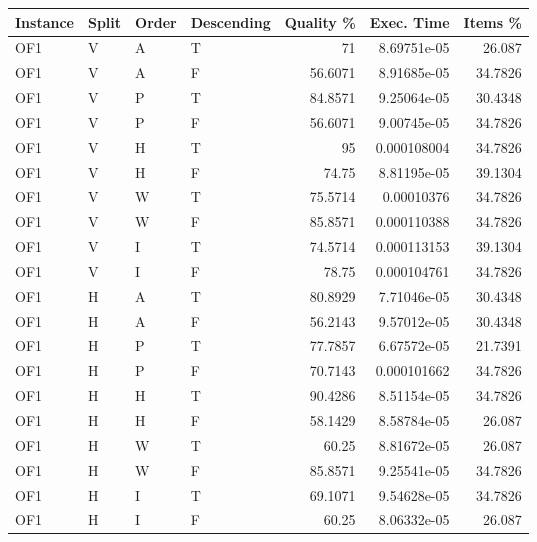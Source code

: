 \begin{longtable}{llllrrr}
    \hline
    Instance & Split & Order & Descending & Quality \% & Exec. Time  & Items \% \\
    \hline
    \endhead
    OF1      & V     & A     & T          & 71         & 8.69751e-05 & 26.087   \\
    OF1      & V     & A     & F          & 56.6071    & 8.91685e-05 & 34.7826  \\
    OF1      & V     & P     & T          & 84.8571    & 9.25064e-05 & 30.4348  \\
    OF1      & V     & P     & F          & 56.6071    & 9.00745e-05 & 34.7826  \\
    OF1      & V     & H     & T          & 95         & 0.000108004 & 34.7826  \\
    OF1      & V     & H     & F          & 74.75      & 8.81195e-05 & 39.1304  \\
    OF1      & V     & W     & T          & 75.5714    & 0.00010376  & 34.7826  \\
    OF1      & V     & W     & F          & 85.8571    & 0.000110388 & 34.7826  \\
    OF1      & V     & I     & T          & 74.5714    & 0.000113153 & 39.1304  \\
    OF1      & V     & I     & F          & 78.75      & 0.000104761 & 34.7826  \\
    OF1      & H     & A     & T          & 80.8929    & 7.71046e-05 & 30.4348  \\
    OF1      & H     & A     & F          & 56.2143    & 9.57012e-05 & 30.4348  \\
    OF1      & H     & P     & T          & 77.7857    & 6.67572e-05 & 21.7391  \\
    OF1      & H     & P     & F          & 70.7143    & 0.000101662 & 34.7826  \\
    OF1      & H     & H     & T          & 90.4286    & 8.51154e-05 & 34.7826  \\
    OF1      & H     & H     & F          & 58.1429    & 8.58784e-05 & 26.087   \\
    OF1      & H     & W     & T          & 60.25      & 8.81672e-05 & 26.087   \\
    OF1      & H     & W     & F          & 85.8571    & 9.25541e-05 & 34.7826  \\
    OF1      & H     & I     & T          & 69.1071    & 9.54628e-05 & 34.7826  \\
    OF1      & H     & I     & F          & 60.25      & 8.06332e-05 & 26.087   \\

\end{longtable}
